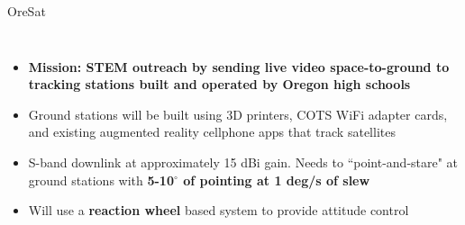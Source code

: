 \documentclass[slidestop,compress]{beamer}
\begin{document}
\begin{frame}[plain]
\begin{block}{\centering OreSat}
\begin{columns}
\begin{itemize}
\item {\bf Mission: STEM outreach by sending live video space-to-ground to tracking stations built and operated by Oregon high schools}
\item Ground stations will be built using 3D printers, COTS WiFi adapter cards, and existing augmented reality cellphone apps that track satellites
\item S-band downlink at approximately 15 dBi gain. Needs to ``point-and-stare" at ground stations with {\bf 5-10$^{\circ}$ of pointing at 1 deg/s of slew}
\item Will use a {\bf{reaction wheel}} based system to provide attitude control

\end{itemize}
\end{columns}
\end{block}    
\end{frame}
\end{document}
